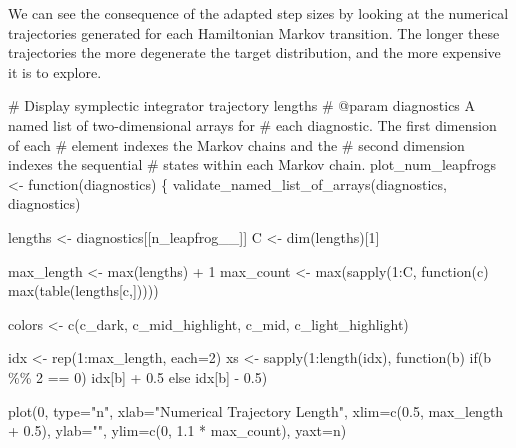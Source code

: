 \documentclass[
  letterpaper,
  DIV=11,
  numbers=noendperiod]{scrartcl}
\newenvironment{Shaded}{\begin{snugshade}}{\end{snugshade}}
\newcommand{\BuiltInTok}[1]{\textcolor[rgb]{0.00,0.23,0.31}{#1}}
\newcommand{\CommentTok}[1]{\textcolor[rgb]{0.37,0.37,0.37}{#1}}
\newcommand{\ControlFlowTok}[1]{\textcolor[rgb]{0.00,0.23,0.31}{#1}}
\newcommand{\DecValTok}[1]{\textcolor[rgb]{0.68,0.00,0.00}{#1}}
\newcommand{\FloatTok}[1]{\textcolor[rgb]{0.68,0.00,0.00}{#1}}
\newcommand{\NormalTok}[1]{\textcolor[rgb]{0.00,0.23,0.31}{#1}}
\newcommand{\OperatorTok}[1]{\textcolor[rgb]{0.37,0.37,0.37}{#1}}
\newcommand{\StringTok}[1]{\textcolor[rgb]{0.13,0.47,0.30}{#1}}
\begin{document}
We can see the consequence of the adapted step sizes by looking at the
numerical trajectories generated for each Hamiltonian Markov transition.
The longer these trajectories the more degenerate the target
distribution, and the more expensive it is to explore.

\begin{Shaded}
\begin{Highlighting}[]
\CommentTok{\# Display symplectic integrator trajectory lengths}
\CommentTok{\# @param diagnostics A named list of two{-}dimensional arrays for }
\CommentTok{\#                    each diagnostic.  The first dimension of each}
\CommentTok{\#                    element indexes the Markov chains and the }
\CommentTok{\#                    second dimension indexes the sequential }
\CommentTok{\#                    states within each Markov chain.}
\NormalTok{plot\_num\_leapfrogs }\OperatorTok{\textless{}{-}}\NormalTok{ function(diagnostics) \{}
\NormalTok{  validate\_named\_list\_of\_arrays(diagnostics, }\StringTok{\textquotesingle{}diagnostics\textquotesingle{}}\NormalTok{)}
  
\NormalTok{  lengths }\OperatorTok{\textless{}{-}}\NormalTok{ diagnostics[[}\StringTok{\textquotesingle{}n\_leapfrog\_\_\textquotesingle{}}\NormalTok{]]}
\NormalTok{  C }\OperatorTok{\textless{}{-}}\NormalTok{ dim(lengths)[}\DecValTok{1}\NormalTok{]}

\NormalTok{  max\_length }\OperatorTok{\textless{}{-}} \BuiltInTok{max}\NormalTok{(lengths) }\OperatorTok{+} \DecValTok{1}
\NormalTok{  max\_count }\OperatorTok{\textless{}{-}} \BuiltInTok{max}\NormalTok{(sapply(}\DecValTok{1}\NormalTok{:C, function(c) }\BuiltInTok{max}\NormalTok{(table(lengths[c,]))))}

\NormalTok{  colors }\OperatorTok{\textless{}{-}}\NormalTok{ c(c\_dark, c\_mid\_highlight, c\_mid, c\_light\_highlight)}

\NormalTok{  idx }\OperatorTok{\textless{}{-}}\NormalTok{ rep(}\DecValTok{1}\NormalTok{:max\_length, each}\OperatorTok{=}\DecValTok{2}\NormalTok{)}
\NormalTok{  xs }\OperatorTok{\textless{}{-}}\NormalTok{ sapply(}\DecValTok{1}\NormalTok{:length(idx), function(b) }\ControlFlowTok{if}\NormalTok{(b }\OperatorTok{\%\%} \DecValTok{2} \OperatorTok{==} \DecValTok{0}\NormalTok{) idx[b] }\OperatorTok{+} \FloatTok{0.5}
                                          \ControlFlowTok{else}\NormalTok{ idx[b] }\OperatorTok{{-}} \FloatTok{0.5}\NormalTok{)}

\NormalTok{  plot(}\DecValTok{0}\NormalTok{, }\BuiltInTok{type}\OperatorTok{=}\StringTok{"n"}\NormalTok{,}
\NormalTok{       xlab}\OperatorTok{=}\StringTok{"Numerical Trajectory Length"}\NormalTok{, }
\NormalTok{       xlim}\OperatorTok{=}\NormalTok{c(}\FloatTok{0.5}\NormalTok{, max\_length }\OperatorTok{+} \FloatTok{0.5}\NormalTok{),}
\NormalTok{       ylab}\OperatorTok{=}\StringTok{""}\NormalTok{, ylim}\OperatorTok{=}\NormalTok{c(}\DecValTok{0}\NormalTok{, }\FloatTok{1.1} \OperatorTok{*}\NormalTok{ max\_count), yaxt}\OperatorTok{=}\StringTok{\textquotesingle{}n\textquotesingle{}}\NormalTok{)}


\end{Highlighting}
\end{Shaded}
\end{document}
